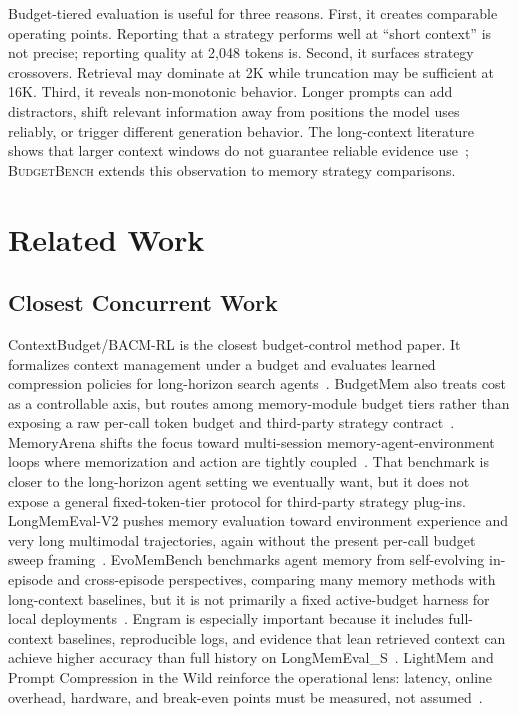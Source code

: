 \documentclass[11pt]{article}
\newcommand{\BudgetBench}{\textsc{BudgetBench}}
\begin{document}
Budget-tiered evaluation is useful for three reasons.  First, it creates
comparable operating points.  Reporting that a strategy performs well at
``short context'' is not precise; reporting quality at 2,048 tokens is.  Second,
it surfaces strategy crossovers.  Retrieval may dominate at 2K while
truncation may be sufficient at 16K.  Third, it reveals non-monotonic behavior.
Longer prompts can add distractors, shift relevant information away from
positions the model uses reliably, or trigger different generation behavior.
The long-context literature shows that larger context windows do not guarantee
reliable evidence use~\citep{liu2023lost,hsieh2024ruler}; \BudgetBench{}
extends this observation to memory strategy comparisons.

\section{Related Work}

\subsection{Closest Concurrent Work}

ContextBudget/BACM-RL is the closest budget-control method paper.  It
formalizes context management under a budget and evaluates learned compression
policies for long-horizon search agents~\citep{wu2026contextbudget}.  BudgetMem
also treats cost as a controllable axis, but routes among memory-module budget
tiers rather than exposing a raw per-call token budget and third-party strategy
contract~\citep{zhang2026budgetmem}.  MemoryArena shifts the focus toward
multi-session memory-agent-environment loops where memorization and action are
tightly coupled~\citep{he2026memoryarena}.  That benchmark is closer to the
long-horizon agent setting we eventually want, but it does not expose a general
fixed-token-tier protocol for third-party strategy plug-ins.  LongMemEval-V2
pushes memory evaluation toward environment experience and very long
multimodal trajectories, again without the present per-call budget sweep
framing~\citep{wu2026longmemevalv2}.  EvoMemBench benchmarks agent memory from
self-evolving in-episode and cross-episode perspectives, comparing many memory
methods with long-context baselines, but it is not primarily a fixed
active-budget harness for local deployments~\citep{wang2026evomembench}.
Engram is especially important because it includes full-context baselines,
reproducible logs, and evidence that lean retrieved context can achieve higher
accuracy than full history on LongMemEval\_S~\citep{wang2026engram}.  LightMem and Prompt
Compression in the Wild reinforce the operational lens: latency, online
overhead, hardware, and break-even points must be measured, not
assumed~\citep{zhang2026lightmem,kummer2026promptcompression}.
\end{document}
